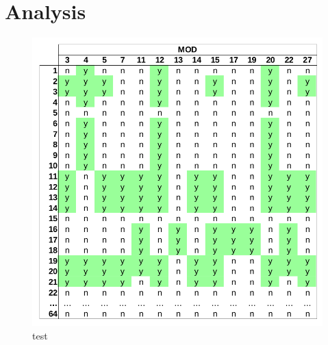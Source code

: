 \chapter{Analysis}

\begin{figure}[h]

\includegraphics[width=\textwidth]{tex/images/mod_analysis}
\caption{test}

\end{figure}